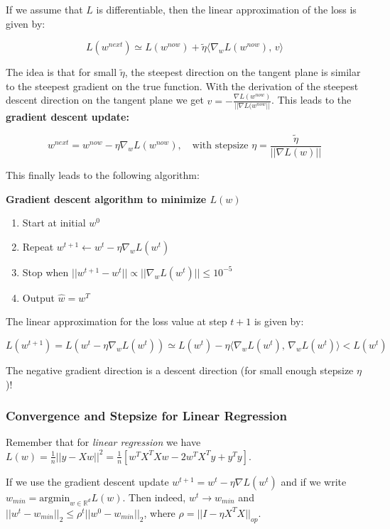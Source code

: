\documentclass[a4paper]{extarticle}
\begin{document}
If we assume that \(L\) is differentiable, then the linear approximation of the loss is given by:

\[
    L(w^{next}) \simeq L(w^{now}) + \tilde{\eta}\langle \nabla_wL(w^{now}), \, v \rangle
\]

The idea is that for small \(\tilde{\eta}\), the steepest direction on the tangent plane is similar to the steepest gradient on the true function. With the derivation of the steepest descent direction on the tangent plane we get \(v = -\frac{\nabla L(w^{now})}{||\nabla L(w^{now}||}\). This leads to the \textbf{gradient descent update:}

\[
    w^{next} = w^{now} - \eta \nabla_w L(w^{now}), \quad \text{with stepsize } \eta = \frac{\tilde{\eta}}{||\nabla L(w)||}
\]

This finally leads to the following algorithm:

\begin{cbox}
    \textbf{Gradient descent algorithm to minimize \(L(w)\)}

    \begin{enumerate}
        \item Start at initial \(w^0\)
        \item Repeat \(w^{t+1} \leftarrow w^t - \eta \nabla_w L(w^t)\)
        \item Stop when \(||w^{t + 1} - w^t|| \propto ||\nabla_w L(w^t)|| \leq 10^{-5} \)
        \item Output \(\hat{w} = w^T\)
    \end{enumerate}
\end{cbox}

The linear approximation for the loss value at step \(t + 1\) is given by:

\[
    L(w^{t+1}) = L(w^t - \eta \nabla_w L(w^t)) \simeq L(w^t) - \eta \langle \nabla_w L(w^t), \, \nabla_w L(w^t) \rangle < L(w^t)
\]

The negative gradient direction is a descent direction (for small enough stepsize \(\eta\))!

\subsubsection{Convergence and Stepsize for Linear Regression}

Remember that for \textit{linear regression} we have \(L(w) = \frac{1}{n} ||y - Xw||^2 = \frac{1}{n}[w^TX^TXw - 2w^TX^Ty + y^Ty]\).

If we use the gradient descent update \(w^{t + 1} = w^t - \eta \nabla L(w^t)\) and if we write \(w_{min} = \text{argmin}_{w \in \mathbb{R}^d} L(w)\). Then indeed, \(w^t \to w_{min}\) and \(||w^t - w_{min}||_2 \leq \rho^t||w^0 - w_{min}||_2\), where \(\rho = ||I - \eta X^TX||_{op}\).
\end{document}
